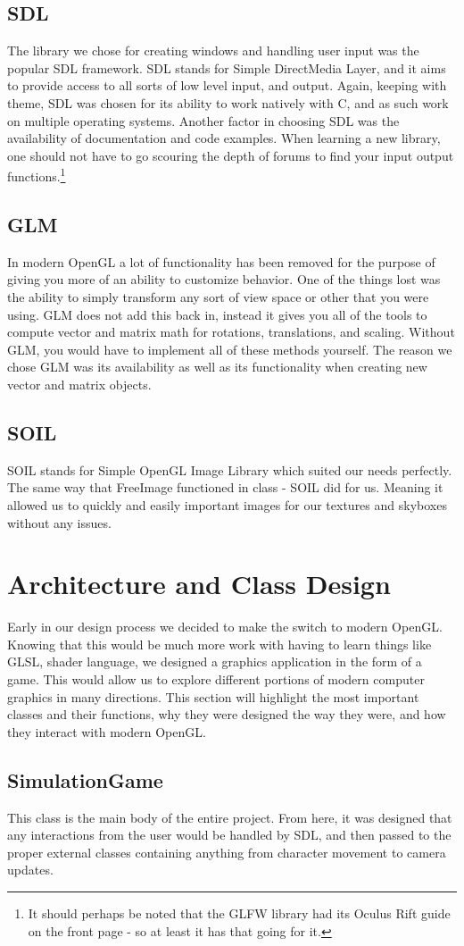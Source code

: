 \documentclass[paper=a4, fontsize=11pt]{scrartcl}
\numberwithin{equation}{section}		%
\numberwithin{figure}{section}			%
\numberwithin{table}{section}				%
\begin{document}
\subsection{SDL}
The library we chose for creating windows and handling user input was the popular SDL framework. SDL stands for Simple DirectMedia Layer, and it aims to provide access to all sorts of low level input, and output. Again, keeping with theme, SDL was chosen for its ability to work natively with C, and as such work on multiple operating systems. Another factor in choosing SDL was the availability of documentation and code examples. When learning a new library, one should not have to go scouring the depth of forums to find your input output functions.\footnote{It should perhaps be noted that the GLFW library had its Oculus Rift guide on the front page - so at least it has that going for it.}
\subsection{GLM}
In modern OpenGL a lot of functionality has been removed for the purpose of giving you more of an ability to customize behavior. One of the things lost was the ability to simply transform any sort of view space or other that you were using. GLM does not add this back in, instead it gives you all of the tools to compute vector and matrix math for rotations, translations, and scaling. Without GLM, you would have to implement all of these methods yourself. The reason we chose GLM was its availability as well as its functionality when creating new vector and matrix objects.
\subsection{SOIL}
SOIL stands for Simple OpenGL Image Library which suited our needs perfectly. The same way that FreeImage functioned in class - SOIL did for us. Meaning it allowed us to quickly and easily important images for our textures and skyboxes without any issues.

\section{Architecture and Class Design}
Early in our design process we decided to make the switch to modern OpenGL. Knowing that this would be much more work with having to learn things like GLSL, shader language, we designed a graphics application in the form of a game. This would allow us to explore different portions of modern computer graphics in many directions. This section will highlight the most important classes and their functions, why they were designed the way they were, and how they interact with modern OpenGL.
\subsection{SimulationGame}
This class is the main body of the entire project. From here, it was designed that any interactions from the user would be handled by SDL, and then passed to the proper external classes containing anything from character movement to camera updates.

\end{document}
